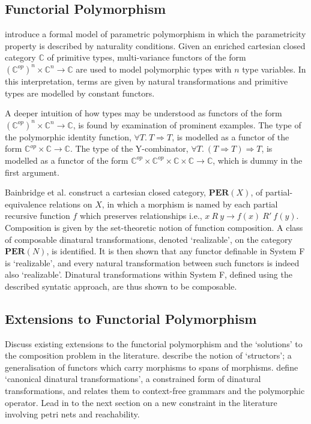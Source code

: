 \documentclass[../../Dissertation.tex]{subfiles}
\begin{document}
\subsection{Functorial Polymorphism}
 introduce a formal model of parametric polymorphism in which the parametricity property is described by naturality conditions. Given an enriched cartesian closed category $\mathbb{C}$ of primitive types, multi-variance functors of the form $(\mathbb{C}^{op})^n \times \mathbb{C}^n \rightarrow \mathbb{C}$ are used to model polymorphic types with $n$ type variables. In this interpretation, terms are given by natural transformations and primitive types are modelled by constant functors.
\par
A deeper intuition of how types may be understood as functors of the form $(\mathbb{C}^{op})^n \times \mathbb{C}^n \rightarrow \mathbb{C}$, is found by examination of prominent examples. The type of the polymorphic identity function, $\forall T.\ T \Rightarrow T$, is modelled as a functor of the form $\mathbb{C}^{op} \times \mathbb{C} \rightarrow \mathbb{C}$. The type of the Y-combinator, $\forall T.\ (T \Rightarrow T) \Rightarrow T$, is modelled as a functor of the form $\mathbb{C}^{op} \times \mathbb{C}^{op} \times \mathbb{C} \times \mathbb{C} \rightarrow \mathbb{C}$, which is dummy in the first argument.
\par
Bainbridge et al. construct a cartesian closed category, $\mathbf{PER}(X)$, of partial-equivalence relations on $X$, in which a morphism is named by each partial recursive function $f$ which preserves relationships i.e., $x\ R\ y \rightarrow f(x)\ R'\ f(y)$. Composition is given by the set-theoretic notion of function composition. A class of composable dinatural transformations, denoted `realizable', on the category $\mathbf{PER}(N)$, is identified. It is then shown that any functor definable in System F is `realizable', and every natural transformation between such functors is indeed also `realizable'. Dinatural transformations within System F, defined using the described syntatic approach, are thus shown to be composable.

\subsection{Extensions to Functorial Polymorphism}
Discuss existing extensions to the functorial polymorphism and the `solutions' to the composition problem in the literature.
\newline\newline
{} describe the notion of `structors'; a generalisation of functors which carry morphisms to spans of morphisms.
\newline\newline
{} define `canonical dinatural transformations', a constrained form of dinatural transformations, and relates them to context-free grammars and the polymorphic operator.
\newline\newline
Lead in to the next section on a new constraint in the literature involving petri nets and reachability.
\end{document}
